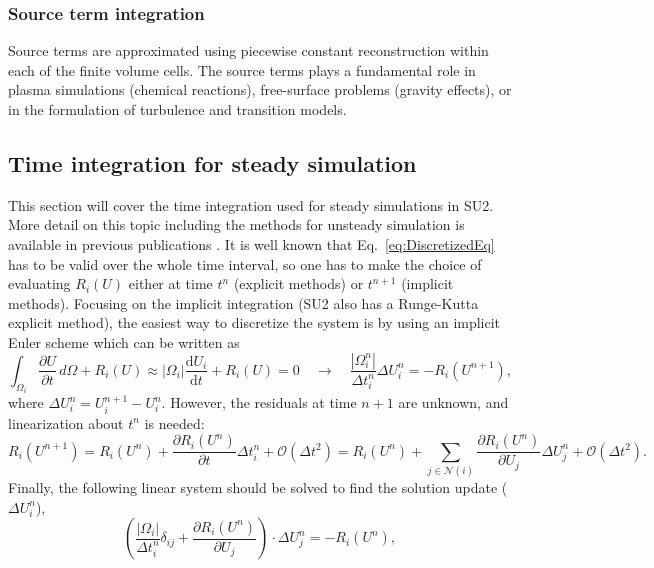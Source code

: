 \subsubsection*{Source term integration}
Source terms are approximated using piecewise constant reconstruction within each of the finite volume cells. The source terms plays a fundamental role in plasma simulations (chemical reactions), free-surface problems (gravity effects), or in the formulation of turbulence and transition models.

\subsection*{Time integration for steady simulation}
This section will cover the time integration used for steady simulations in SU2. More detail on this topic including the methods for unsteady simulation is available in previous publications \cite{palacios2013,Palacios:2014,PalaciosEconomon:2014 }. It is well known that Eq.~\ref{eq:DiscretizedEq} has to be valid over the whole time interval, so one has to make the choice of evaluating $R_i(U)$ either at time $t^{n}$ (explicit methods) or $t^{n+1}$ (implicit methods). Focusing on the implicit integration (SU2 also has a Runge-Kutta explicit method), the easiest way to discretize the system is by using an implicit Euler scheme which can be written as
\begin{equation}
\int_{\Omega_i}{\frac{\partial{U}}{\partial{t}}}\,d\Omega + R_i(U) \approx |\Omega_i| \frac{\mathrm{d}U_i}{\mathrm{d}t} + R_i(U) = 0 \quad \rightarrow \quad \frac{|\Omega_i^n|}{\Delta t_i^n} \Delta U_i^n = - R_i(U^{n+1}),
\label{eq:Implicit_Euler}
\end{equation}
where $\Delta U_i^n = U_i^{n+1} - U_i^n$. However, the residuals at time $n+1$ are unknown, and linearization about $t^n$ is needed:
\begin{equation}
R_i(U^{n+1})  =  R_i(U^n) + \frac{\partial R_i (U^n)}{\partial t} \Delta t_i^n + \mathcal{O}(\Delta t^2) = R_i(U^n) + \sum_{j \in \mathcal{N}(i)} \frac{\partial R_i (U^n)}{\partial U_j} \Delta U_j^n + \mathcal{O}(\Delta t^2).
\end{equation}
Finally, the following linear system should be solved to find the solution update ($\Delta U_i^n$),
\begin{equation}\label{linear_system}
\left( \frac{|\Omega_i|}{\Delta t_i^n} \delta_{ij} + \frac{\partial R_i (U^n)}{\partial U_j} \right) \cdot \Delta U_j^n = -R_i(U^n),
\end{equation}
